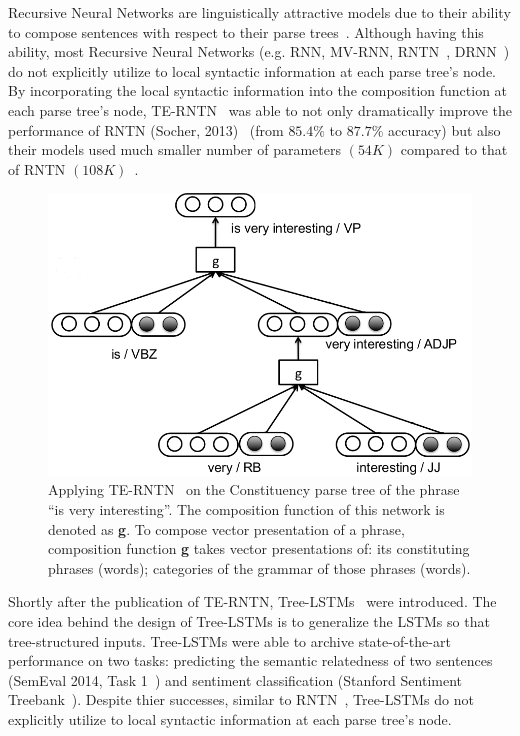 Recursive Neural Networks are linguistically attractive models due to their ability to compose sentences with respect to their parse trees~\cite{treeLSTM}. 
Although having this ability, most Recursive Neural Networks (e.g. RNN, MV-RNN, RNTN~\cite{socher2013recursive}, DRNN~\cite{IrsoyDRNN}) do not explicitly utilize to local syntactic information at each parse tree's node.
By incorporating the local syntactic information into the composition function at each parse tree's node, TE-RNTN~\cite{tag-embedding-rnn} was able to not only dramatically improve the performance of RNTN (Socher, 2013)~\cite{socher2013recursive} (from \(85.4\%\) to \(87.7\%\) accuracy) but also their models used much smaller number of parameters \((54K)\) compared to that of RNTN \((108K)\)~\cite{tag-embedding-rnn}.

\begin{figure}[H]
    \centering
    \includegraphics[scale=0.4]{figure/example-compose-tag}
    \caption[Applying TE-RNTN on the phrase ``is very interesting'']{Applying TE-RNTN~\cite{tag-embedding-rnn} on the Constituency parse tree of the phrase ``is very interesting''. 
    The composition function of this network is denoted as \textbf{g}.
    To compose vector presentation of a phrase, composition function \textbf{g} takes vector presentations of: its constituting phrases (words); categories of the grammar of those phrases (words).}
    \label{fig:example-compose}
\end{figure}

Shortly after the publication of TE-RNTN, Tree-LSTMs~\cite{treeLSTM} were introduced.
The core idea behind the design of Tree-LSTMs is to generalize the LSTMs so that tree-structured inputs.
Tree-LSTMs were able to archive state-of-the-art performance on two tasks: predicting the semantic relatedness of two sentences (SemEval 2014, Task 1~\cite{SemeEvalTask1}) and sentiment classification (Stanford Sentiment Treebank~\cite{socher2013recursive}).
Despite thier successes, similar to RNTN~\cite{socher2013recursive}, Tree-LSTMs do not explicitly utilize to local syntactic information at each parse tree's node.

